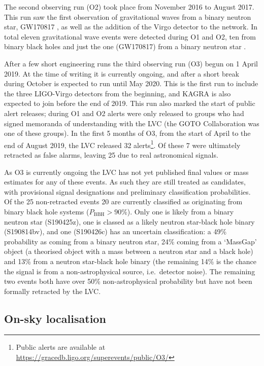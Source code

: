 \begin{colsection}
\begin{colsection}
The second observing run (O2)  took place from November 2016 to August 2017. This run saw the first observation of gravitational waves from a binary neutron star, GW170817 \citep{GW170817}, as well as the addition of the Virgo detector to the network. In total eleven gravitational wave events were detected during O1 and O2, ten from binary black holes and just the one (GW170817) from a binary neutron star \citep{GW_catalog}.

After a few short engineering runs the third observing run (O3)  begun on 1 April 2019. At the time of writing it is currently ongoing, and after a short break during October is expected to run until May 2020. This is the first run to include the three LIGO-Virgo detectors from the beginning, and KAGRA is also expected to join before the end of 2019. This run also marked the start of public alert releases; during O1 and O2 alerts were only released to groups who had signed memoranda of understanding with the LVC (the GOTO Collaboration was one of these groups). In the first 5 months of O3, from the start of April to the end of August 2019, the LVC released 32 alerts\footnote{Public alerts are available at \url{https://gracedb.ligo.org/superevents/public/O3/}}. Of these 7 were ultimately retracted as false alarms, leaving 25 due to real astronomical signals.

As O3 is currently ongoing the LVC has not yet published final values or mass estimates for any of these events. As such they are still treated as candidates, with provisional signal designations and preliminary classification probabilities. Of the 25 non-retracted events 20 are currently classified as originating from binary black hole systems ($P_\text{BBH}>90\%$). Only one is likely from a binary neutron star (S190425z), one is classed as a likely neutron star-black hole binary (S190814bv), and one (S190426c) has an uncertain classification: a 49\% probability as coming from a binary neutron star, 24\% coming from a `MassGap' object (a theorised object with a mass between a neutron star and a black hole) and 13\% from a neutron star-black hole binary (the remaining 14\% is the chance the signal is from a non-astrophysical source, i.e.\ detector noise). The remaining two events both have over 50\% non-astrophysical probability but have not been formally retracted by the LVC.\@

\end{colsection}

\newpage
\subsection{On-sky localisation}
\label{sec:gw_localisation}
\begin{colsection}


\end{colsection}
\end{colsection}
